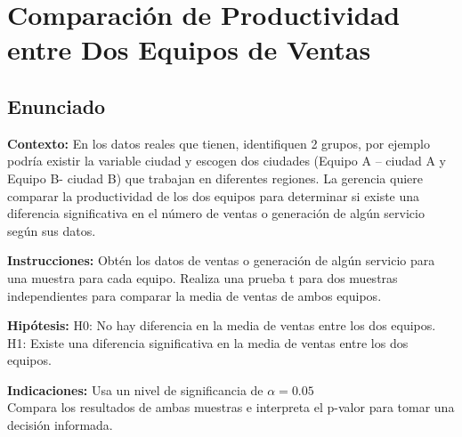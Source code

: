 \newpage
\section{Comparación de Productividad entre Dos Equipos de Ventas}

\subsection{Enunciado}
\textbf{Contexto:}
En los datos reales que tienen, identifiquen 2 grupos, por ejemplo podría existir la variable ciudad y
escogen dos ciudades (Equipo A – ciudad A y Equipo B- ciudad B) que trabajan en diferentes regiones. La gerencia quiere comparar
la productividad de los dos equipos para determinar si existe una diferencia significativa en el número de ventas
o generación de algún servicio según sus datos.

\textbf{Instrucciones:}
Obtén los datos de ventas o generación de algún servicio para una muestra para cada equipo.
Realiza una prueba t para dos muestras independientes para comparar la media de ventas de ambos equipos.

\textbf{Hipótesis:}
H0: No hay diferencia en la media de ventas entre los dos equipos.
H1: Existe una diferencia significativa en la media de ventas entre los dos equipos.

\textbf{Indicaciones:}
Usa un nivel de significancia de \( \alpha = 0.05 \)
\\
Compara los resultados de ambas muestras e interpreta el p-valor para tomar una decisión informada.
